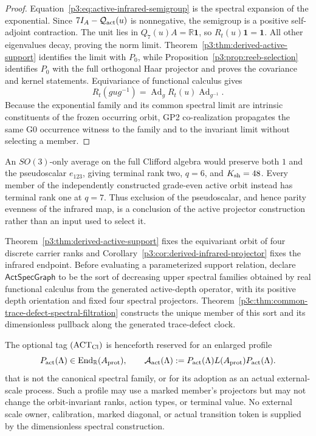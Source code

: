 \documentclass[12pt,a4paper]{article}
\begin{document}
\begin{proof}
Equation~\eqref{p3:eq:active-infrared-semigroup} is the spectral expansion of
the exponential.  Since \(7I_A-\mathcal Q_{\rm act}(u)\) is nonnegative, the
semigroup is a positive self-adjoint contraction.  The unit lies in
\(Q_7(u)A=\mathbb R\mathbf1\), so \(R_t(u)\mathbf1=\mathbf1\).  All other
eigenvalues decay, proving the norm limit.  Theorem~\ref{p3:thm:derived-active-support}
identifies the limit with \(P_0\), while
Proposition~\ref{p3:prop:reeb-selection} identifies \(P_0\) with the full
orthogonal Haar projector and proves the covariance and kernel statements.
Equivariance of functional calculus gives
\[
 R_t(gug^{-1})
 =\operatorname{Ad}_gR_t(u)\operatorname{Ad}_{g^{-1}}.
\]
Because the exponential family and its common spectral limit are intrinsic
constituents of the frozen occurring orbit, GP2 co-realization propagates the
same G0 occurrence witness to the family and to the invariant limit without
selecting a member.
\end{proof}

\begin{remark}
An \(SO(3)\)-only average on the full Clifford algebra would preserve both
\(1\) and the pseudoscalar \(e_{123}\), giving terminal rank two,
\(q=6\), and \(K_{\rm sh}=48\).  Every member of the independently
constructed grade-even active orbit instead has terminal rank one at \(q=7\).
Thus exclusion of the
pseudoscalar, and hence parity evenness of the infrared map, is a conclusion
of the active projector construction rather than an input used to select it.
\end{remark}

\begin{definition}
\label{p3:def:active_corner}
Theorem~\ref{p3:thm:derived-active-support} fixes the equivariant orbit of four
discrete carrier ranks
and Corollary~\ref{p3:cor:derived-infrared-projector} fixes the infrared
endpoint.  Before evaluating a parameterized support relation, declare
\(\mathsf{ActSpecGraph}\) to be the sort of decreasing upper spectral
families obtained by real functional calculus from the generated
active-depth operator, with its positive depth orientation and fixed four
spectral projectors.  Theorem~\ref{p3c:thm:common-trace-defect-spectral-filtration}
constructs the unique member of this sort and its dimensionless pullback
along the generated trace-defect clock.

The optional tag \((\mathrm{ACT}_{\rm Cl})\) is henceforth reserved for an
enlarged profile
\[
 P_{\rm act}(\Lambda)\in\operatorname{End}_{\mathbb R}(A_{\rm prot}),
 \qquad
 \mathcal A_{\rm act}(\Lambda)
 :=P_{\rm act}(\Lambda)L(A_{\rm prot})P_{\rm act}(\Lambda).
\]
that is not the canonical spectral family, or for its adoption as an actual
external-scale process.  Such a profile may use a marked member's projectors
but may not change the orbit-invariant ranks, action types, or terminal value.
No external scale owner, calibration, marked diagonal, or actual transition
token is supplied by the dimensionless spectral construction.
\end{definition}
\end{document}

